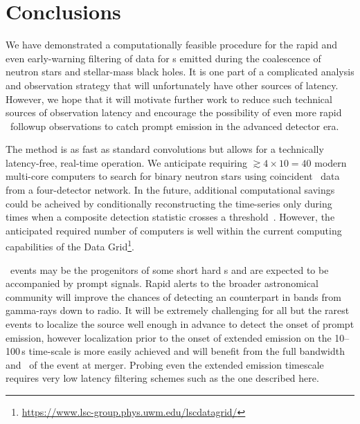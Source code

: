 \section{Conclusions}
\label{sec:conclusions}

We have demonstrated a computationally feasible procedure for the rapid and
even early-warning filtering of data for \GW{}s emitted during the coalescence
of neutron stars and stellar-mass black holes.  It is one part of a complicated
analysis and observation strategy that will unfortunately have other sources of
latency.  However, we hope that it will motivate further work to reduce such
technical sources of \GW{} observation latency and encourage the possibility of
even more rapid \EM\ followup observations to catch prompt emission in the
advanced detector era.  

The \lloid{} method is as fast as standard \fft{} convolutions but allows for a
technically latency-free, real-time operation.  We anticipate requiring
$\gtrsim 4 \times 10 = 40$ modern multi-core computers to search for binary
neutron stars using coincident \GW\ data from a four-detector network.  In the
future, additional computational savings could be acheived by conditionally
reconstructing the \SNR{} time-series only during times when a composite
detection statistic crosses a threshold~\citep{svd-compdetstat}.  However, the
anticipated required number of computers is well within the current computing
capabilities of the \LIGO{} Data
Grid\footnote{\url{https://www.lsc-group.phys.uwm.edu/lscdatagrid/}}.

\CBC\ events may be the progenitors of some short hard \GRB{}s and are expected
to be accompanied by prompt \EM{} signals.  Rapid alerts to the broader
astronomical community will improve the chances of detecting an \EM{}
counterpart in bands from gamma-rays down to radio.  It will be extremely
challenging for all but the rarest events to localize the source well enough in
advance to detect the onset of prompt emission, however localization prior to
the onset of extended emission on the 10--100\,s time-scale is more easily
achieved and will benefit from the full bandwidth and \SNR\ of the \GW{} event
at merger.  Probing even the extended emission timescale requires very low
latency filtering schemes such as the one described here.

\begin{comment}
The detection algorithm we described has no intrinsic latency.  However, there
are fundamental and practical latencies associated with the analysis and
detection procedure. For example, the \LIGO{} data acquisition records science
data in 1/16~s blocks~\citep{Bork2001}. Data must also be aggregated from all
of the \GW\ observatories using global computer networks capable of high
bandwidth but perhaps only modest latency.  This could introduce a latency of
$\sim$100~ms.  Lastly, the software implementation of the algorithm itself may
introduce latency.  
\end{comment}

